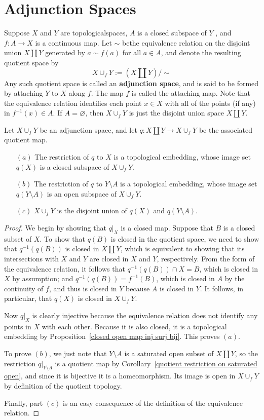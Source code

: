 \section{Adjunction Spaces}
\begin{definition}
Suppose $X$ and $Y$ are topologicalspaces, $A$ is a closed subspace of $Y$ , and $f:A\to X$ is a continuous map. Let $\sim$ bethe equivalence relation on the disjoint union $X\amalg Y$ generated by $a\sim f(a)$ for all $a\in A$, and denote the resulting quotient space by
\[X\cup_{f}Y:=(X\amalg Y)/\text{$\sim$}\]
Any such quotient space is called an \textbf{adjunction space}, and is said to be formed by
attaching $Y$ to $X$ along $f$. The map $f$ is called the attaching map. Note that the
equivalence relation identifies each point $x\in X$ with all of the points (if any) in $f^{-1}(x)\in A$. If $A=\varnothing$, then $X\cup_{f} Y$ is just the disjoint union space $X\amalg Y$.
\end{definition}
\begin{theorem}\label{adjunction space prop}
Let $X\cup_{f}Y$ be an adjunction space, and let $q:X\amalg Y\to X\cup_{f}Y$ be the associated quotient map.
\begin{itemize}
\item[$(a)$]The restriction of $q$ to $X$ is a topological embedding, whose image set $q(X)$ is a closed subspace of $X\cup_{f}Y$.
\item[$(b)$]The restriction of $q$ to $Y\setminus A$ is a topological embedding, whose image set $q(Y\setminus A)$ is an open subspace of $X\cup_{f}Y$.
\item[$(c)$]$X\cup_{f}Y$ is the disjoint union of $q(X)$ and $q(Y\setminus A)$.
\end{itemize}
\end{theorem}
\begin{proof}
We begin by showing that $q|_X$ is a closed map. Suppose that $B$ is a closed subset of $X$. To show that $q(B)$ is closed in the quotient space, we need to show that $q^{-1}(q(B))$ is closed in $X\amalg Y$, which is equivalent to showing that its intersections with $X$ and $Y$ are closed in $X$ and $Y$, respectively. From the form of the equivalence relation, it follows that $q^{-1}(q(B))\cap X=B$, which is closed in $X$ by assumption; and $q^{-1}(q(B))=f^{-1}(B)$, which is closed in $A$ by the continuity of $f$, and thus is closed in $Y$ because $A$ is closed in $Y$. It follows, in particular, that $q(X)$ is closed in $X\cup_f Y$.\par
Now $q|_X$ is clearly injective because the equivalence relation does not identify any points in $X$ with each other. Because it is also closed, it is a topological embedding by Proposition~\ref{closed open map inj surj bij}. This proves $(a)$.\par
To prove $(b)$, we just note that $Y\setminus A$ is a saturated open subset of $X\amalg Y$, so the restriction $q|_{Y\setminus A}$ is a quotient map by Corollary~\ref{quotient restriction on saturated open}, and since it is bijective it is a homeomorphism. Its image is open in $X\cup_f Y$ by definition of the quotient topology.\par
Finally, part $(c)$ is an easy consequence of the definition of the equivalence relation.
\end{proof}
